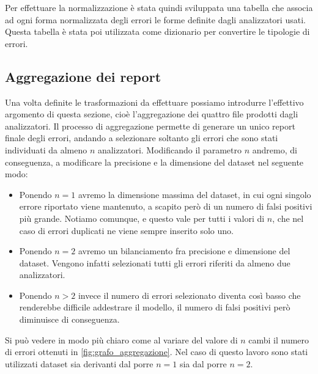 Per effettuare la normalizzazione è stata quindi sviluppata una tabella che associa ad ogni forma normalizzata degli errori le forme definite dagli analizzatori usati.
Questa tabella è stata poi utilizzata come dizionario per convertire le tipologie di errori.



\subsection{Aggregazione dei report}
Una volta definite le trasformazioni da effettuare possiamo introdurre l'effettivo argomento di questa sezione, cioè l'aggregazione dei quattro file prodotti dagli analizzatori.
Il processo di aggregazione permette di generare un unico report finale degli errori, andando a selezionare soltanto gli errori che sono stati individuati da almeno $n$ analizzatori. 
Modificando il parametro $n$ andremo, di conseguenza, a modificare la precisione e la dimensione del dataset nel seguente modo:
  \begin{itemize}
    \item Ponendo $n=1$ avremo la dimensione massima del dataset, in cui ogni singolo errore riportato viene mantenuto, a scapito però di un numero di falsi positivi più grande.
          Notiamo comunque, e questo vale per tutti i valori di $n$, che nel caso di errori duplicati ne viene sempre inserito solo uno.
    \item Ponendo $n=2$ avremo un bilanciamento fra precisione e dimensione del dataset. Vengono infatti selezionati tutti gli errori riferiti da almeno due analizzatori. 
    \item Ponendo $n>2$ invece il numero di errori selezionato diventa così basso che renderebbe difficile addestrare il modello, il numero di falsi positivi però diminuisce di conseguenza.
  \end{itemize}
Si può vedere in modo più chiaro come al variare del valore di $n$ cambi il numero di errori ottenuti in \autoref{fig:grafo_aggregazione}.
Nel caso di questo lavoro sono stati utilizzati dataset sia derivanti dal porre $n=1$ sia dal porre $n=2$.

